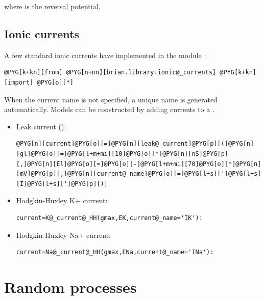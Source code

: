 \documentclass[letterpaper,10pt,english]{manual}
\begin{document}
where  is the reversal potential.


\subsection{Ionic currents}

A few standard ionic currents have implemented in the module :

\begin{Verbatim}[commandchars=@\[\]]
@PYG[k+kn][from] @PYG[n+nn][brian.library.ionic@_currents] @PYG[k+kn][import] @PYG[o][*]
\end{Verbatim}

When the current name is not specified,
a unique name is generated automatically. Models can be constructed by adding currents to a
.
\begin{itemize}
\item {} 
Leak current ():

\begin{Verbatim}[commandchars=@\[\]]
@PYG[n][current]@PYG[o][=]@PYG[n][leak@_current]@PYG[p][(]@PYG[n][gl]@PYG[o][=]@PYG[l+m+mi][10]@PYG[o][*]@PYG[n][nS]@PYG[p][,]@PYG[n][El]@PYG[o][=]@PYG[o][-]@PYG[l+m+mi][70]@PYG[o][*]@PYG[n][mV]@PYG[p][,]@PYG[n][current@_name]@PYG[o][=]@PYG[l+s][']@PYG[l+s][I]@PYG[l+s][']@PYG[p][)]
\end{Verbatim}

\item {} 
Hodgkin-Huxley K+ current:

\begin{Verbatim}[commandchars=@\[\]]
current=K@_current@_HH(gmax,EK,current@_name='IK'):
\end{Verbatim}

\item {} 
Hodgkin-Huxley Na+ current:

\begin{Verbatim}[commandchars=@\[\]]
current=Na@_current@_HH(gmax,ENa,current@_name='INa'):
\end{Verbatim}

\end{itemize}

\resetcurrentobjects
\hypertarget{--doc-randomprocesses}{}

\section{Random processes}
\end{document}
